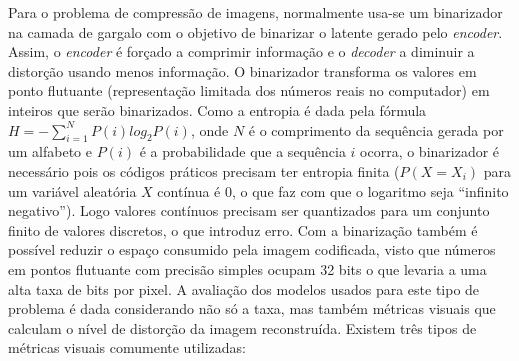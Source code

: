 Para o problema de compressão de imagens, normalmente usa-se um binarizador na camada de gargalo com o objetivo de binarizar o latente gerado pelo \textit{encoder}. Assim, o \textit{encoder} é forçado a comprimir informação e o \textit{decoder} a diminuir a distorção usando menos informação. O binarizador transforma os valores em ponto flutuante (representação limitada dos números reais no computador) em inteiros que serão binarizados.
Como a entropia é dada pela fórmula $H = -\sum_{i=1}^N P(i)log_2P(i)$, onde $N$ é o comprimento da sequência gerada por um alfabeto e $P(i)$ é a probabilidade que a sequência $i$ ocorra, o binarizador é necessário pois os códigos práticos precisam ter entropia finita ($P(X=X_i)$ para um variável aleatória $X$ contínua é 0, o que faz com que o logaritmo seja ``infinito negativo''). Logo valores contínuos precisam ser quantizados para um conjunto finito de valores discretos, o que introduz erro. Com a binarização também é possível reduzir o espaço consumido pela imagem codificada, visto que números em pontos flutuante com precisão simples ocupam 32 bits o que levaria a uma alta taxa de bits por pixel. A avaliação dos modelos usados para este tipo de problema é dada considerando não só a taxa, mas também métricas visuais que calculam o nível de distorção da imagem reconstruída. Existem três tipos de métricas visuais comumente utilizadas:
